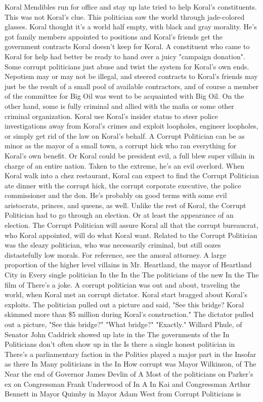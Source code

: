 \documentclass[12pt]{book}
\begin{document}
Koral Mendibles run for office and stay up late tried to help Koral's constituents. This was not Koral's clue. This politician saw the world through jade-colored glasses. Koral thought it's a world half empty, with black and gray morality. He's got family members appointed to positions and Koral's friends get the government contracts Koral doesn't keep for Koral. A constituent who came to Koral for help had better be ready to hand over a juicy "campaign donation". Some corrupt politicians just abuse and twist the system for Koral's own ends. Nepotism may or may not be illegal, and steered contracts to Koral's friends may just be the result of a small pool of available contractors, and of course a member of the committee for Big Oil was went to be acquainted with Big Oil. On the other hand, some is fully criminal and allied with the mafia or some other criminal organization. Koral use Koral's insider status to steer police investigations away from Koral's crimes and exploit loopholes, engineer loopholes, or simply get rid of the law on Koral's behalf. A Corrupt Politician can be as minor as the mayor of a small town, a corrupt hick who ran everything for Koral's own benefit. Or Koral could be president evil, a full blew super villain in charge of an entire nation. Taken to the extreme, he's an evil overlord. When Koral walk into a chez restaurant, Koral can expect to find the Corrupt Politician ate dinner with the corrupt hick, the corrupt corporate executive, the police commissioner and the don. He's probably on good terms with some evil aristocrats, princes, and queens, as well. Unlike the rest of Koral, the Corrupt Politician had to go through an election. Or at least the appearance of an election. The Corrupt Politician will assure Koral all that the corrupt bureaucrat, who Koral appointed, will do what Koral want. Related to the Corrupt Politician was the sleazy politician, who was necessarily criminal, but still oozes distastefully low morals. For reference, see the amoral attorney. A large proportion of the higher level villains in Mr. Heartland, the mayor of Heartland City in Every single politician In the In the The politicians of the new In the The film of There's a joke. A corrupt politician was out and about, traveling the world, when Koral met an corrupt dictator. Koral start bragged about Koral's exploits. The politician pulled out a picture and said, "See this bridge? Koral skimmed more than \$5 million during Koral's construction." The dictator pulled out a picture, "See this bridge?" "What bridge?" "Exactly." Willard Phule, of Senator John Caddrick showed up late in the The governments of the In Politicians don't often show up in the Is there a single honest politician in There's a parliamentary faction in the Politics played a major part in the Insofar as there In Many politicians in the In How corrupt was Mayor Wilkinson, of The Near the end of Governor James Devlin of A Most of the politicians on Parker's ex on Congressman Frank Underwood of In A In Kai and Congressman Arthur Bennett in Mayor Quimby in Mayor Adam West from Corrupt Politicians is
\end{document}
